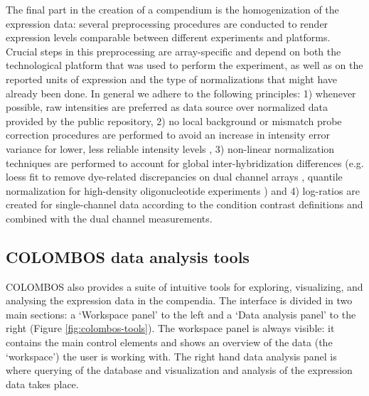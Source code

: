 The final part in the creation of a compendium is the homogenization of the 
expression data: several preprocessing procedures are conducted to render 
expression levels comparable between different experiments and platforms. 
Crucial steps in this preprocessing are array-specific and depend on both the 
technological platform that was used to perform the experiment, as well as on 
the reported units of expression and the type of normalizations that might have 
already been done. In general we adhere to the following principles: 1) 
whenever possible, raw intensities are preferred as data source over normalized 
data provided by the public repository, 2) no local background or mismatch 
probe correction procedures are performed to avoid an increase in intensity 
error variance for lower, less reliable intensity levels 
\cite{Ritchie2007,Engelen2006,Li2001}, 3) non-linear normalization techniques 
are performed to account for global inter-hybridization differences (e.g. loess 
fit to remove dye-related discrepancies on dual channel arrays \cite{Yang2002}, 
quantile normalization for high-density oligonucleotide experiments 
\cite{Bolstad2003}) and 4) log-ratios are created for single-channel data 
according to the condition contrast definitions and combined with the dual 
channel measurements.


\subsection{COLOMBOS data analysis tools}
COLOMBOS also provides a suite of intuitive tools for exploring, visualizing, 
and analysing the expression data in the compendia. The interface is divided in 
two main sections: a `Workspace panel' to the left and a `Data analysis panel' 
to the right (Figure \ref{fig:colombos-tools}). The workspace panel is always 
visible: it contains the main control elements and shows an overview of the 
data (the `workspace') the user is working with. The right hand data analysis 
panel is where querying of the database and visualization and analysis of the 
expression data takes place.

